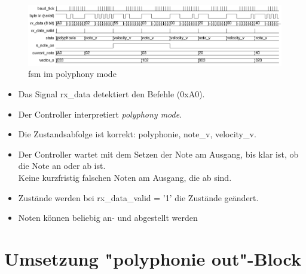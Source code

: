 \begin{figure}[H]
	\centering
	\includegraphics[width=1\textwidth]{images/midi_control/wave_polyphonie.png}
	\caption{fsm im polyphony mode}
	\label{fig.midicontrol_polyphonie}
\end{figure}


\begin{itemize}
	\item Das Signal rx\_data detektiert den Befehle (0xA0).
	\item Der Controller interpretiert  \textit{polyphony mode}. 
	\item Die Zustandsabfolge ist korrekt: polyphonie, note\_v, velocity\_v.
	\item Der Controller wartet mit dem Setzen der Note am Ausgang, bis klar ist, ob die Note an oder ab ist. \\
	Keine kurzfristig falschen Noten am Ausgang, die ab sind.
	\item Zustände werden bei rx\_data\_valid = '1' die Zustände geändert.
	\item Noten können beliebig an- und abgestellt werden
\end{itemize}


\section{Umsetzung "polyphonie out"-Block}\label{sect.polyphonie_umsetzung}